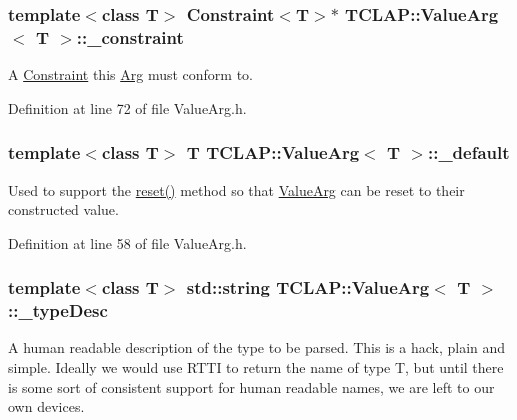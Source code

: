 \subsubsection[{\+\_\+constraint}]{\setlength{\rightskip}{0pt plus 5cm}template$<$class T$>$ {\bf Constraint}$<$T$>$$\ast$ {\bf T\+C\+L\+A\+P\+::\+Value\+Arg}$<$ T $>$\+::\+\_\+constraint\hspace{0.3cm}{\ttfamily [protected]}}\label{class_t_c_l_a_p_1_1_value_arg_aa383908cff37688cf7493d46c840d03b}
A \hyperlink{class_t_c_l_a_p_1_1_constraint}{Constraint} this \hyperlink{class_t_c_l_a_p_1_1_arg}{Arg} must conform to. 

Definition at line 72 of file Value\+Arg.\+h.

\hypertarget{class_t_c_l_a_p_1_1_value_arg_a118e3a7932700a8e3626d8f9ee2e0c95}{}
\subsubsection[{\+\_\+default}]{\setlength{\rightskip}{0pt plus 5cm}template$<$class T$>$ T {\bf T\+C\+L\+A\+P\+::\+Value\+Arg}$<$ T $>$\+::\+\_\+default\hspace{0.3cm}{\ttfamily [protected]}}\label{class_t_c_l_a_p_1_1_value_arg_a118e3a7932700a8e3626d8f9ee2e0c95}
Used to support the \hyperlink{class_t_c_l_a_p_1_1_value_arg_a1bc480b71c4d8ac3646e796af8fb6e14}{reset()} method so that \hyperlink{class_t_c_l_a_p_1_1_value_arg}{Value\+Arg} can be reset to their constructed value. 

Definition at line 58 of file Value\+Arg.\+h.

\hypertarget{class_t_c_l_a_p_1_1_value_arg_a78c5e5b67ce4bcebb57c886d9aa49259}{}
\subsubsection[{\+\_\+type\+Desc}]{\setlength{\rightskip}{0pt plus 5cm}template$<$class T$>$ std\+::string {\bf T\+C\+L\+A\+P\+::\+Value\+Arg}$<$ T $>$\+::\+\_\+type\+Desc\hspace{0.3cm}{\ttfamily [protected]}}\label{class_t_c_l_a_p_1_1_value_arg_a78c5e5b67ce4bcebb57c886d9aa49259}
A human readable description of the type to be parsed. This is a hack, plain and simple. Ideally we would use R\+T\+T\+I to return the name of type T, but until there is some sort of consistent support for human readable names, we are left to our own devices. 

